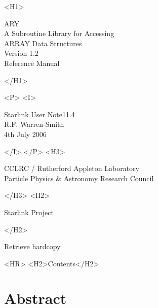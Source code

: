 \documentclass[twoside,11pt]{article}
\newcommand{\stardoccategory}  {Starlink User Note}
\newcommand{\stardocsource}    {sun\stardocnumber}
\newcommand{\stardocnumber}    {11.4}
\newcommand{\stardocauthors}   {R.F. Warren-Smith}
\newcommand{\stardocdate}      {4th July 2006}
\newcommand{\stardoctitle}     {ARY\\[2.5ex]
                                A Subroutine Library for Accessing\\
                                ARRAY Data Structures}
\newcommand{\stardocversion}   {Version 1.2}
\newcommand{\stardocmanual}    {Reference Manual}
\newcommand{\htmladdnormallink}[2]{#1}
\newcommand{\htmladdimg}[1]{}
\newcommand{\htmlref}[2]{#1}
\newcommand{\htmladdtonavigation}[1]{}
\newcommand{\xlabel}[1]{}
\newcommand{\latexonlytoc}[0]{\tableofcontents}
\begin{document}
\begin{htmlonly}
   \xlabel{}
   \begin{rawhtml} <H1> \end{rawhtml}
      \stardoctitle\\
      \stardocversion\\
      \stardocmanual
   \begin{rawhtml} </H1> \end{rawhtml}


   \begin{rawhtml} <P> <I> \end{rawhtml}
   \stardoccategory \stardocnumber \\
   \stardocauthors \\
   \stardocdate
   \begin{rawhtml} </I> </P> <H3> \end{rawhtml}
      \htmladdnormallink{CCLRC}{http://www.cclrc.ac.uk} /
      \htmladdnormallink{Rutherford Appleton Laboratory}
                        {http://www.cclrc.ac.uk/ral} \\
      \htmladdnormallink{Particle Physics \& Astronomy Research Council}
                        {http://www.pparc.ac.uk} \\
   \begin{rawhtml} </H3> <H2> \end{rawhtml}
      \htmladdnormallink{Starlink Project}{http://star-www.rl.ac.uk/}
   \begin{rawhtml} </H2> \end{rawhtml}
   \htmladdnormallink{\htmladdimg{source.gif} Retrieve hardcopy}
      {http://star-www.rl.ac.uk/cgi-bin/hcserver?\stardocsource}\\

  \label{stardoccontents}
  \begin{rawhtml} 
    <HR>
    <H2>Contents</H2>
  \end{rawhtml}
  \renewcommand{\latexonlytoc}[0]{}
  \htmladdtonavigation{\htmlref{\htmladdimg{contents_motif.gif}}
        {stardoccontents}}

  \section{\xlabel{abstract}Abstract}
\end{htmlonly}
\end{document}
